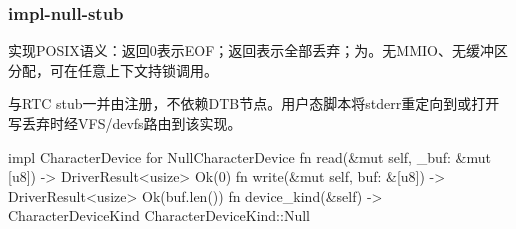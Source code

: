 
\subsubsection{impl-null-stub}

实现POSIX语义：返回0表示EOF；返回表示全部丢弃；为。无MMIO、无缓冲区分配，可在任意上下文持锁调用。

与RTC stub一并由注册，不依赖DTB节点。用户态脚本将stderr重定向到或打开写丢弃时经VFS/devfs路由到该实现。

\begin{rustcode}
impl CharacterDevice for NullCharacterDevice {
    fn read(&mut self, _buf: &mut [u8]) -> DriverResult<usize> {
        Ok(0)
    }
    fn write(&mut self, buf: &[u8]) -> DriverResult<usize> {
        Ok(buf.len())
    }
    fn device_kind(&self) -> CharacterDeviceKind {
        CharacterDeviceKind::Null
    }
}
\end{rustcode}
